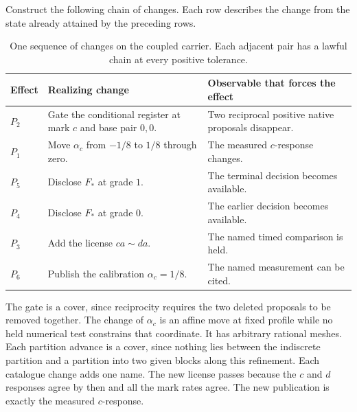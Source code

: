 Construct the following chain of changes. Each row describes the
change from the state already attained by the preceding rows.
\begin{table}[ht]
\centering
\small
\begin{tabularx}{\linewidth}{@{}lXX@{}}
\toprule
Effect & Realizing change & Observable that forces the effect\\
\midrule
\(P_2\) & Gate the conditional register at mark \(c\) and base pair \(0,0\). &
Two reciprocal positive native proposals disappear.\\
\(P_1\) & Move \(\alpha_c\) from \(-1/8\) to \(1/8\) through zero. &
The measured \(c\)-response changes.\\
\(P_5\) & Disclose \(F_*\) at grade \(1\). &
The terminal decision becomes available.\\
\(P_4\) & Disclose \(F_*\) at grade \(0\). &
The earlier decision becomes available.\\
\(P_3\) & Add the license \(ca\sim da\). &
The named timed comparison is held.\\
\(P_6\) & Publish the calibration \(\alpha_c=1/8\). &
The named measurement can be cited.\\
\bottomrule
\end{tabularx}
\caption{One sequence of changes on the coupled carrier. Each adjacent pair has a lawful chain at every positive tolerance.}
\label{tab:omissions}
\end{table}
The gate is a cover, since reciprocity requires the two deleted
proposals to be removed together. The change of \(\alpha_c\) is
an affine move at fixed profile while no held numerical test
constrains that coordinate. It has arbitrary rational meshes.
Each partition advance is a cover, since nothing lies between the
indiscrete partition and a partition into two given blocks along
this refinement. Each catalogue change adds one name.
The new license passes because the \(c\) and \(d\) responses
agree by then and all the mark rates agree. The new publication
is exactly the measured \(c\)-response.

